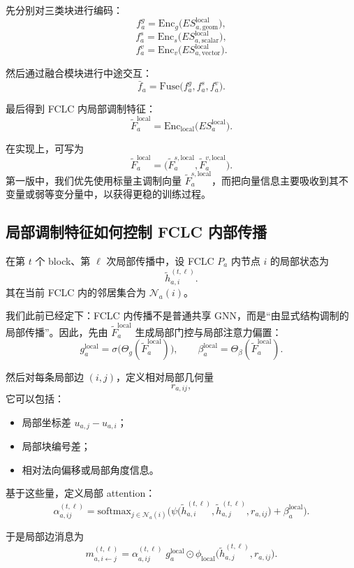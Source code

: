 \documentclass[12pt,a4paper]{ctexart}
\begin{document}
先分别对三类块进行编码：
\[
f_a^{g}=\mathrm{Enc}_{g}\big(ES_{a,\mathrm{geom}}^{\mathrm{local}}\big),
\]
\[
f_a^{s}=\mathrm{Enc}_{s}\big(ES_{a,\mathrm{scalar}}^{\mathrm{local}}\big),
\]
\[
f_a^{v}=\mathrm{Enc}_{v}\big(ES_{a,\mathrm{vector}}^{\mathrm{local}}\big).
\]

然后通过融合模块进行中途交互：
\[
\bar f_a
=
\mathrm{Fuse}
\big(
f_a^{g},f_a^{s},f_a^{v}
\big).
\]

最后得到 FCLC 内局部调制特征：
\[
\tilde F_a^{\mathrm{local}}
=
\mathrm{Enc}_{\mathrm{local}}
\big(
ES_a^{\mathrm{local}}
\big).
\]

在实现上，可写为
\[
\tilde F_a^{\mathrm{local}}
=
\big(
\tilde F_a^{s,\mathrm{local}},
\tilde F_a^{v,\mathrm{local}}
\big).
\]
第一版中，我们优先使用标量主调制向量 \(\tilde F_a^{s,\mathrm{local}}\)，而把向量信息主要吸收到其不变量或弱等变分量中，以获得更稳的训练过程。

\subsection{局部调制特征如何控制 FCLC 内部传播}

在第 \(t\) 个 block、第 \(\ell\) 次局部传播中，设 FCLC \(P_a\) 内节点 \(i\) 的局部状态为
\[
\tilde h_{a,i}^{(t,\ell)}.
\]
其在当前 FCLC 内的邻居集合为 \(\mathcal N_a(i)\)。

我们此前已经定下：FCLC 内传播不是普通共享 GNN，而是“由显式结构调制的局部传播”。因此，先由 \(\tilde F_a^{\mathrm{local}}\) 生成局部门控与局部注意力偏置：
\[
g_a^{\mathrm{local}}
=
\sigma\big(
\Theta_g(\tilde F_a^{\mathrm{local}})
\big),
\qquad
\beta_a^{\mathrm{local}}
=
\Theta_\beta(\tilde F_a^{\mathrm{local}}).
\]

然后对每条局部边 \((i,j)\)，定义相对局部几何量
\[
r_{a,ij},
\]
它可以包括：
\begin{itemize}[leftmargin=2em]
    \item 局部坐标差 \(u_{a,j}-u_{a,i}\)；
    \item 局部块编号差；
    \item 相对法向偏移或局部角度信息。
\end{itemize}

基于这些量，定义局部 attention：
\[
\alpha_{a,ij}^{(t,\ell)}
=
\mathrm{softmax}_{j\in\mathcal N_a(i)}
\Big(
\psi\big(
\tilde h_{a,i}^{(t,\ell)},
\tilde h_{a,j}^{(t,\ell)},
r_{a,ij}
\big)
+
\beta_a^{\mathrm{local}}
\Big).
\]

于是局部边消息为
\[
m_{a,i\leftarrow j}^{(t,\ell)}
=
\alpha_{a,ij}^{(t,\ell)}
\;
g_a^{\mathrm{local}}
\odot
\phi_{\mathrm{local}}
\big(
\tilde h_{a,j}^{(t,\ell)},
r_{a,ij}
\big).
\]
\end{document}
